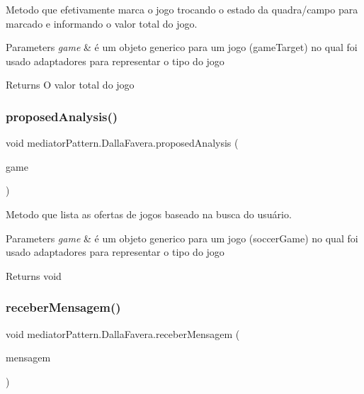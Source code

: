 Metodo que efetivamente marca o jogo trocando o estado da quadra/campo para marcado e informando o valor total do jogo. 


\begin{DoxyParams}{Parameters}
{\em game} & é um objeto generico para um jogo (game\+Target) no qual foi usado adaptadores para representar o tipo do jogo \\
\hline
\end{DoxyParams}
\begin{DoxyReturn}{Returns}
O valor total do jogo 
\end{DoxyReturn}
\mbox{\label{classmediator_pattern_1_1_dalla_favera_a2c916582524a756d23c263b62335b432}} 
\subsubsection{\texorpdfstring{proposedAnalysis()}{proposedAnalysis()}}
{\footnotesize\ttfamily void mediator\+Pattern.\+Dalla\+Favera.\+proposed\+Analysis (\begin{DoxyParamCaption}\item[{\mbox{\hyperlink{classtemplate_pattern_1_1soccer_game}{soccer\+Game}}}]{game }\end{DoxyParamCaption})}



Metodo que lista as ofertas de jogos baseado na busca do usuário. 


\begin{DoxyParams}{Parameters}
{\em game} & é um objeto generico para um jogo (soccer\+Game) no qual foi usado adaptadores para representar o tipo do jogo \\
\hline
\end{DoxyParams}
\begin{DoxyReturn}{Returns}
void 
\end{DoxyReturn}
\mbox{\label{classmediator_pattern_1_1_dalla_favera_a96c0fbf7e2f33a3b8176c1993f6cf8e2}} 
\subsubsection{\texorpdfstring{receberMensagem()}{receberMensagem()}}
{\footnotesize\ttfamily void mediator\+Pattern.\+Dalla\+Favera.\+receber\+Mensagem (\begin{DoxyParamCaption}\item[{String}]{mensagem }\end{DoxyParamCaption})}



